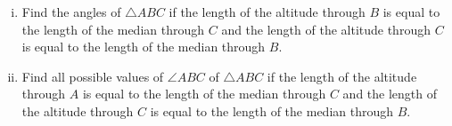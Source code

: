 \documentclass[varwidth]{standalone}
\begin{document}
    \begin{enumerate}[(i)]
        \item Find the angles of $\triangle ABC$ if the length of the altitude through $B$ is equal to the length of the median through $C$ and the length of the altitude through $C$ is equal to the length of the median through $B$.
        \item Find all possible values of $\angle ABC$ of $\triangle ABC$ if the length of the altitude through $A$ is equal to the length of the median through $C$ and the length of the altitude through $C$ is equal to the length of the median through $B$.
    \end{enumerate}
\end{document}
